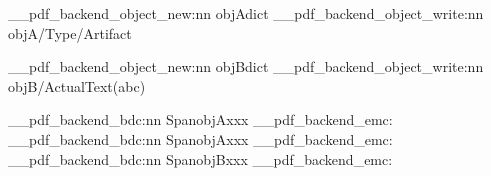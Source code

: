 \documentclass{article}
\begin{document}
\ExplSyntaxOn
\__pdf_backend_object_new:nn   {objA}{dict}
\__pdf_backend_object_write:nn {objA}{/Type/Artifact}

\__pdf_backend_object_new:nn   {objB}{dict}
\__pdf_backend_object_write:nn {objB}{/ActualText(abc)}

\vspace*{44\baselineskip}
\__pdf_backend_bdc:nn {Span}{objA}xxx
\__pdf_backend_emc:
\\
\__pdf_backend_bdc:nn {Span}{objA}xxx
\__pdf_backend_emc:
\\
\__pdf_backend_bdc:nn {Span}{objB}xxx
\__pdf_backend_emc:

\ExplSyntaxOff
\end{document}

